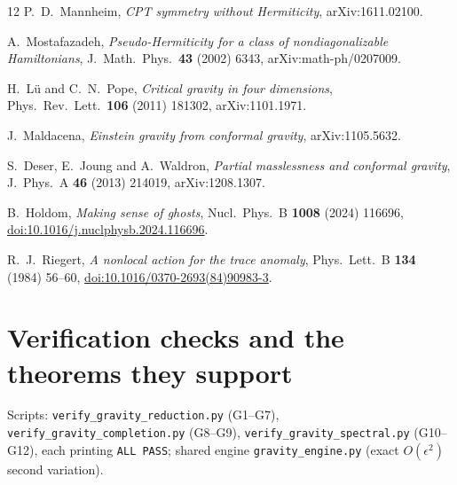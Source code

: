 \documentclass[11pt]{article}
\theoremstyle{definition}
\theoremstyle{remark}
\begin{document}
\begin{thebibliography}{12}
P.~D.~Mannheim,
\emph{CPT symmetry without Hermiticity},
arXiv:1611.02100.

A.~Mostafazadeh,
\emph{Pseudo-Hermiticity for a class of nondiagonalizable Hamiltonians},
J.\ Math.\ Phys.\ \textbf{43} (2002) 6343, arXiv:math-ph/0207009.

H.~L\"u and C.~N.~Pope,
\emph{Critical gravity in four dimensions},
Phys.\ Rev.\ Lett.\ \textbf{106} (2011) 181302, arXiv:1101.1971.

J.~Maldacena,
\emph{Einstein gravity from conformal gravity},
arXiv:1105.5632.

S.~Deser, E.~Joung and A.~Waldron,
\emph{Partial masslessness and conformal gravity},
J.\ Phys.\ A \textbf{46} (2013) 214019, arXiv:1208.1307.

B.~Holdom,
\emph{Making sense of ghosts},
Nucl.\ Phys.\ B \textbf{1008} (2024) 116696,
\href{https://doi.org/10.1016/j.nuclphysb.2024.116696}
{doi:10.1016/j.nuclphysb.2024.116696}.

R.~J.~Riegert,
\emph{A nonlocal action for the trace anomaly},
Phys.\ Lett.\ B \textbf{134} (1984) 56--60,
\href{https://doi.org/10.1016/0370-2693(84)90983-3}
{doi:10.1016/0370-2693(84)90983-3}.

\end{thebibliography}

\appendix

\section{Verification checks and the theorems they support}
\label{app:checks}

Scripts: \texttt{verify\_gravity\_reduction.py} (G1--G7),
\texttt{verify\_gravity\_completion.py} (G8--G9),
\texttt{verify\_gravity\_spectral.py} (G10--G12), each printing
\texttt{ALL PASS}; shared engine \texttt{gravity\_engine.py} (exact
$O(\epsilon^2)$ second variation).
\end{document}
